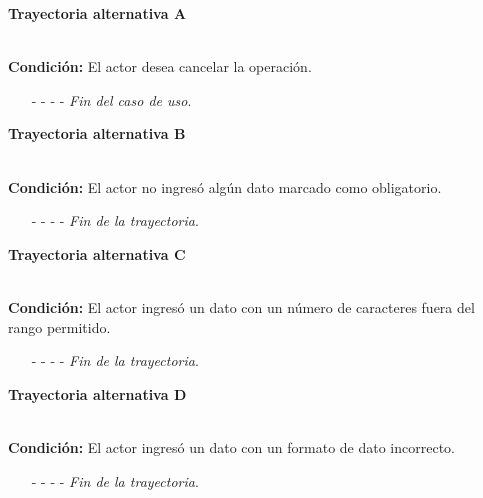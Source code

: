 \hypertarget{CU7-1-2:TAA}{\textbf{Trayectoria alternativa A}}\\
\noindent \textbf{Condición:} El actor desea cancelar la operación.
\begin{enumerate}
	\UCpaso[\UCactor] Solicita cancelar la operación oprimiendo el botón  de la pantalla 
	\UCpaso[\UCsist] Muestra la pantalla  ó .
	\item[- -] - - {\em {Fin del caso de uso}}.%
\end{enumerate}
\hypertarget{CU7-1-2:TAB}{\textbf{Trayectoria alternativa B}}\\
\noindent \textbf{Condición:} El actor no ingresó algún dato marcado como obligatorio.
\begin{enumerate}
	\UCpaso[\UCsist] Muestra el mensaje  señalando el campo que presenta el error en la pantalla .
	\UCpaso Regresa al paso \ref{CU7.1.2-P4} de la trayectoria principal.
	\item[- -] - - {\em {Fin de la trayectoria}}.%
\end{enumerate}
\hypertarget{CU7-1-2:TAC}{\textbf{Trayectoria alternativa C}}\\
\noindent \textbf{Condición:} El actor ingresó un dato con un número de caracteres fuera del rango permitido.
\begin{enumerate}
	\UCpaso[\UCsist] Muestra el mensaje  señalando el campo que presenta el error en la pantalla .
	\UCpaso Regresa al paso \ref{CU7.1.2-P4} de la trayectoria principal.
	\item[- -] - - {\em {Fin de la trayectoria}}.%
\end{enumerate}
\hypertarget{CU7-1-2:TAD}{\textbf{Trayectoria alternativa D}}\\
\noindent \textbf{Condición:} El actor ingresó un dato con un formato de dato incorrecto.
\begin{enumerate}
	\UCpaso[\UCsist] Muestra el mensaje  señalando el campo que presenta el error en la pantalla .
	\UCpaso Regresa al paso \ref{CU7.1.2-P4} de la trayectoria principal.
	\item[- -] - - {\em {Fin de la trayectoria}}.
\end{enumerate}
